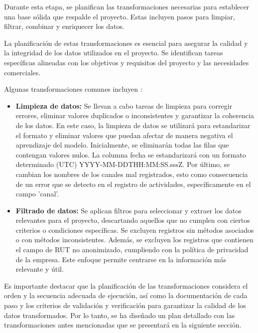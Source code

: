 Durante esta etapa, se planifican las transformaciones necesarias para establecer una base sólida que respalde el proyecto. Estas incluyen pasos para limpiar, filtrar, combinar y enriquecer los datos.

La planificación de estas transformaciones es esencial para asegurar la calidad y la integridad de los datos utilizados en el proyecto. Se identifican tareas específicas alineadas con los objetivos y requisitos del proyecto y las necesidades comerciales.

Algunas transformaciones comunes incluyen \cite{etl-toolkit}:

\begin{itemize}
    \item \textbf{Limpieza de datos:} Se llevan a cabo tareas de limpieza para corregir errores, eliminar valores duplicados o inconsistentes y garantizar la coherencia de los datos. En este caso, la limpieza de datos se utilizará para estandarizar el formato y eliminar valores que puedan afectar de manera negativa el aprendizaje del modelo. Inicialmente, se eliminarán todas las filas que contengan valores nulos. La columna fecha se estandarizará con un formato determinado (UTC) YYYY-MM-DDTHH:MM:SS.sssZ. Por último, se cambian los nombres de los canales mal registrados, esto como consecuencia de un error que se detecto en el registro de actividades, específicamente en el campo 'canal'.

    \item \textbf{Filtrado de datos:} Se aplican filtros para seleccionar y extraer los datos relevantes para el proyecto, descartando aquellos que no cumplen con ciertos criterios o condiciones específicas. Se excluyen registros sin métodos asociados o con métodos inconsistentes. Además, se excluyen los registros que contienen el campo de RUT no anonimizado, cumpliendo con la política de privacidad de la empresa. Este enfoque permite centrarse en la información más relevante y útil.
\end{itemize}

Es importante destacar que la planificación de las transformaciones considera el orden y la secuencia adecuada de ejecución, así como la documentación de cada paso y los criterios de validación y verificación para garantizar la calidad de los datos transformados. Por lo tanto, se ha diseñado un plan detallado con las transformaciones antes mencionadas que se presentará en la siguiente sección.